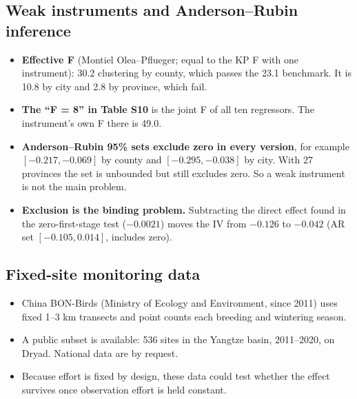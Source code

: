 \documentclass[11pt]{article}
\begin{document}
\subsection{Weak instruments and Anderson--Rubin inference}
\begin{itemize}
\item \textbf{Effective F} (Montiel Olea--Pflueger; equal to the KP F with one instrument): 30.2 clustering by county, which passes the 23.1 benchmark. It is 10.8 by city and 2.8 by province, which fail.
\item \textbf{The ``F = 8'' in Table S10} is the joint F of all ten regressors. The instrument's own F there is 49.0.
\item \textbf{Anderson--Rubin 95\% sets exclude zero in every version}, for example $[-0.217,-0.069]$ by county and $[-0.295,-0.038]$ by city. With 27 provinces the set is unbounded but still excludes zero. So a weak instrument is not the main problem.
\item \textbf{Exclusion is the binding problem.} Subtracting the direct effect found in the zero-first-stage test ($-0.0021$) moves the IV from $-0.126$ to $-0.042$ (AR set $[-0.105, 0.014]$, includes zero).
\end{itemize}

\subsection{Fixed-site monitoring data}
\begin{itemize}
\item China BON-Birds (Ministry of Ecology and Environment, since 2011) uses fixed 1--3 km transects and point counts each breeding and wintering season.
\item A public subset is available: 536 sites in the Yangtze basin, 2011--2020, on Dryad. National data are by request.
\item Because effort is fixed by design, these data could test whether the effect survives once observation effort is held constant.
\end{itemize}

\end{document}
